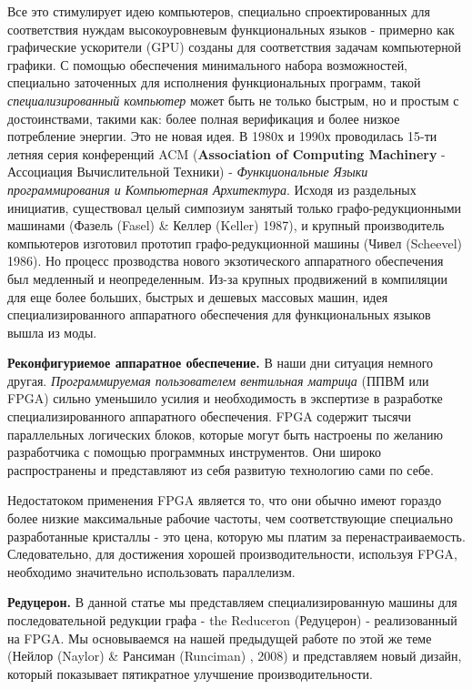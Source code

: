 \documentclass[14pt]{extarticle}
\begin{document}
Все это стимулирует идею компьютеров, специально спроектированных для соответствия нуждам высокоуровневым функциональных языков - примерно как графические ускорители (GPU) созданы для соответствия задачам компьютерной графики. С помощью обеспечения минимального набора возможностей, специально заточенных для исполнения функциональных программ, такой \textit{специализированный компьютер} может быть не только быстрым, но и простым с достоинствами, такими как: более полная верификация и более низкое потребление энергии. Это не новая идея. В 1980х и 1990х проводилась 15-ти летняя серия конференций ACM (\textbf{Association of Computing Machinery} - Ассоциация Вычислительной Техники) - \textit{Функциональные Языки программирования и Компьютерная Архитектура}. Исходя из раздельных инициатив, существовал целый симпозиум занятый только графо-редукционными машинами (Фазель (Fasel) \& Келлер (Keller) 1987), и крупный производитель компьютеров изготовил прототип графо-редукционной машины (Чивел (Scheevel) 1986). Но процесс прозводства нового экзотического аппаратного обеспечения был медленный и неопределенным. Из-за крупных продвижений в компиляции для еще более больших, быстрых и дешевых массовых машин, идея специализированного аппаратного обеспечения для функциональных языков вышла из моды.

\textbf{Реконфигуриемое аппаратное обеспечение.} В наши дни ситуация немного другая. \textit{Программируемая пользователем вентильная матрица} (ППВМ или FPGA) сильно уменьшило усилия и необходимость в экспертизе в разработке специализированного аппаратного обеспечения. FPGA содержит тысячи параллельных логических блоков, которые могут быть настроены по желанию разработчика с помощью программных инструментов. Они широко распространены и представляют из себя развитую технологию сами по себе. 

Недостатоком применения FPGA является то, что они обычно имеют гораздо более низкие максимальные рабочие частоты, чем соответствующие специально разработанные кристаллы - это цена, которую мы платим за перенастраиваемость. Следовательно, для достижения хорошей производительности, используя FPGA, необходимо значительно использовать параллелизм. 

\textbf{Редуцерон.} В данной статье мы представляем специализированную машины для последовательной редукции графа - the Reduceron  (Редуцерон) - реализованный на FPGA. Мы основываемся на нашей предыдущей работе по этой же теме (Нейлор (Naylor) \& Рансиман (Runciman) , 2008) и представляем новый дизайн, который показывает пятикратное улучшение производительности.
\end{document}
